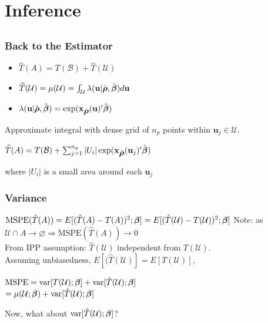 \documentclass[mathserif,compress]{beamer}\usepackage{graphicx, color}
\def\bu{\mathbf{u}}
\def\bx{\mathbf{x}}
\def\cB{\mathcal{B}}
\def\cU{\mathcal{U}}
\def\bbeta{\mbox{\boldmath $\beta$}}
\def\brho{\mbox{\boldmath $\rho$}}
\def\var{\textrm{var}}
\def\upp{^\prime}
\begin{document}

\section{Inference}
\subsection{}
\begin{frame}[fragile]
\frametitle{Back to the Estimator}

\begin{itemize}
	\item $\widehat{T}(A) = T(\cB) + \widehat{T}(\cU)$
	\item $\widehat{T}(\cU) =\mu(\cU)=\int_\cU \lambda(\bu|\hat{\brho},\hat{\bbeta})d\bu$
	\item $ \lambda(\bu|\hat{\brho},\hat{\bbeta}) = \exp(\bx_{\hat{\brho}}(\bu)\upp\hat{\bbeta})$
\end{itemize}
Approximate integral with dense grid of $n_p$ points within $\bu_j \in \cU$.
\begin{center}
$\widehat{T}(A) = T(\cB) + \sum_{j=1}^{n_p}|U_i|\exp(\bx_{\hat{\brho}}(\bu_j)\upp\hat{\bbeta})$
\end{center}
where $|U_i|$ is a small area around each $\bu_j$
\end{frame}


\begin{frame}[fragile]
\frametitle{Variance}

$\textrm{MSPE}(\hat{T}(A)) = E[(\hat{T}(A) - T(A))^2;\bbeta] = E[(\hat{T}(\cU) - T(\cU))^2;\bbeta]$
Note: as $\cU \cap A \to \varnothing \Rightarrow \textrm{MSPE}(\widehat{T}(A)) \to 0$ \\
From IPP assumption: $\hat{T}(\cU)$ independent from $T(\cU)$. \\
Assuming unbiasedness, $E[(\hat{T}(\cU)] = E[T(\cU)]$,
\begin{center}
$\textrm{MSPE} = \var[T(\cU);\bbeta] + \var[\hat{T}(\cU);\bbeta]$ \\
$= \mu(\cU;\bbeta) + \var[\hat{T}(\cU);\bbeta]$ \\
\end{center}
Now, what about $\var[\hat{T}(\cU);\bbeta]$?
\end{frame}
\end{document}
